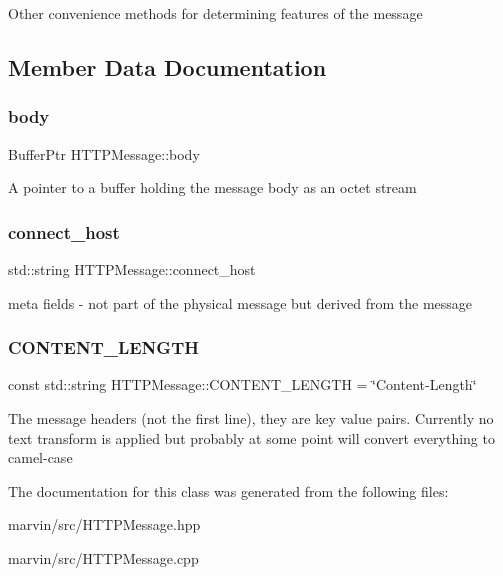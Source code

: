Other convenience methods for determining features of the message 

\subsection{Member Data Documentation}
\mbox{\label{class_h_t_t_p_message_a829d9bbdf115fdf2ade51fd83b3df289}} 
\subsubsection{\texorpdfstring{body}{body}}
{\footnotesize\ttfamily Buffer\+Ptr H\+T\+T\+P\+Message\+::body}

A pointer to a buffer holding the message body as an octet stream \mbox{\label{class_h_t_t_p_message_ae2b74f937ddf8b95e786b481d63cd9d4}} 
\subsubsection{\texorpdfstring{connect\+\_\+host}{connect\_host}}
{\footnotesize\ttfamily std\+::string H\+T\+T\+P\+Message\+::connect\+\_\+host}

meta fields -\/ not part of the physical message but derived from the message \mbox{\label{class_h_t_t_p_message_a838b1a3df96db9e01deb4241de335777}} 
\subsubsection{\texorpdfstring{C\+O\+N\+T\+E\+N\+T\+\_\+\+L\+E\+N\+G\+TH}{CONTENT\_LENGTH}}
{\footnotesize\ttfamily const std\+::string H\+T\+T\+P\+Message\+::\+C\+O\+N\+T\+E\+N\+T\+\_\+\+L\+E\+N\+G\+TH = \char`\"{}Content-\/Length\char`\"{}\hspace{0.3cm}{\ttfamily [static]}}

The message headers (not the first line), they are key value pairs. Currently no text transform is applied but probably at some point will convert everything to camel-\/case 

The documentation for this class was generated from the following files\+:\begin{DoxyCompactItemize}
\item 
marvin/src/H\+T\+T\+P\+Message.\+hpp\item 
marvin/src/H\+T\+T\+P\+Message.\+cpp\end{DoxyCompactItemize}
